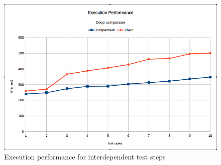 \begin{figure}[ht]
	\label{fig:ef}
	\centering
	\includegraphics[width=\textwidth]{grafiken/exec_deep}
	\caption{Execution performance for interdependent test steps}
\end{figure}

